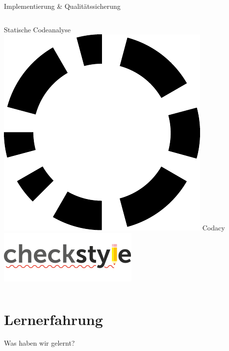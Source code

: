 \documentclass[xcolor=dvipsnames]{beamer}
\begin{document}
\begin{frame}{Implementierung \& Qualitätssicherung}
\begin{columns}
\begin{column}{0.5\textwidth}
\begin{block}{Statische Codeanalyse}
                    \includegraphics[width=(\textwidth / 4)]{img/codacy.pdf}
                    Codacy\\
                    \includegraphics[width=(\textwidth / 2)]{img/checkstyle.png}
                \end{block}
            \end{column}
        \end{columns}
    \end{frame}
    \section{Lernerfahrung}
    \begin{frame}
        \begin{center}
            \Huge Was haben wir gelernt?
        \end{center}
    \end{frame}
\end{document}
